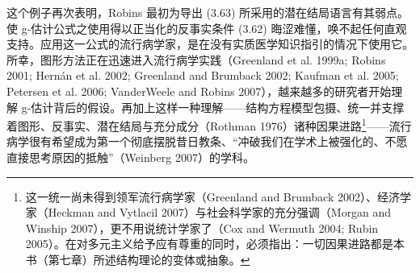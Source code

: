 这个例子再次表明，Robins 最初为导出 (3.63) 所采用的潜在结局语言有其弱点。使 g-估计公式之使用得以正当化的反事实条件 (3.62) 晦涩难懂，唤不起任何直观支持。应用这一公式的流行病学家，是在没有实质医学知识指引的情况下使用它。所幸，图形方法正在迅速进入流行病学实践（Greenland et al. 1999a; Robins 2001; Hernán et al. 2002; Greenland and Brumback 2002; Kaufman et al. 2005; Petersen et al. 2006; VanderWeele and Robins 2007），越来越多的研究者开始理解 g-估计背后的假设。再加上这样一种理解——结构方程模型包摄、统一并支撑着图形、反事实、潜在结局与充分成分（Rothman 1976）诸种因果进路\footnote{这一统一尚未得到领军流行病学家（Greenland and Brumback 2002）、经济学家（Heckman and Vytlacil 2007）与社会科学家的充分强调（Morgan and Winship 2007），更不用说统计学家了（Cox and Wermuth 2004; Rubin 2005）。在对多元主义给予应有尊重的同时，必须指出：一切因果进路都是本书（第七章）所述结构理论的变体或抽象。}——流行病学很有希望成为第一个彻底摆脱昔日教条、“冲破我们在学术上被强化的、不愿直接思考原因的抵触”（Weinberg 2007）的学科。
